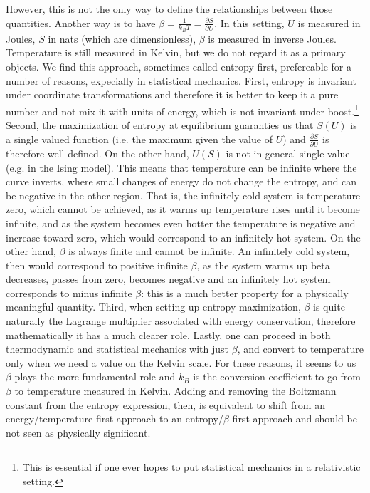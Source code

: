 \documentclass{article}
\begin{document}
However, this is not the only way to define the relationships between those quantities. Another way is to have $\beta = \frac{1}{k_B T} = \frac{\partial S}{\partial U}$. In this setting, $U$ is measured in Joules, $S$ in nats (which are dimensionless), $\beta$ is measured in inverse Joules. Temperature is still measured in Kelvin, but we do not regard it as a primary objects. We find this approach, sometimes called entropy first, prefereable for a number of reasons, expecially in statistical mechanics. First, entropy is invariant under coordinate transformations and therefore it is better to keep it a pure number and not mix it with units of energy, which is not invariant under boost.\footnote{This is essential if one ever hopes to put statistical mechanics in a relativistic setting.} Second, the maximization of entropy at equilibrium guaranties us that $S(U)$ is a single valued function (i.e. the maximum given the value of $U$) and $\frac{\partial S}{\partial U}$ is therefore well defined. On the other hand, $U(S)$ is not in general single value (e.g. in the Ising model). This means that temperature can be infinite where the curve inverts, where small changes of energy do not change the entropy, and can be negative in the other region. That is, the infinitely cold system is temperature zero, which cannot be achieved, as it warms up temperature rises until it become infinite, and as the system becomes even hotter the temperature is negative and increase toward zero, which would correspond to an infinitely hot system. On the other hand, $\beta$ is always finite and cannot be infinite. An infinitely cold system, then would correspond to positive infinite $\beta$, as the system warms up beta decreases, passes from zero, becomes negative and an infinitely hot system corresponds to minus infinite $\beta$: this is a much better property for a physically meaningful quantity. Third, when setting up entropy maximization, $\beta$ is quite naturally the Lagrange multiplier associated with energy conservation, therefore mathematically it has a much clearer role. Lastly, one can proceed in both thermodynamic and statistical mechanics with just $\beta$, and convert to temperature only when we need a value on the Kelvin scale. For these reasons, it seems to us $\beta$ plays the more fundamental role and $k_B$ is the conversion coefficient to go from $\beta$ to temperature measured in Kelvin. Adding and removing the Boltzmann constant from the entropy expression, then, is equivalent to shift from an energy/temperature first approach to an entropy/$\beta$ first approach and should be not seen as physically significant.
\end{document}
